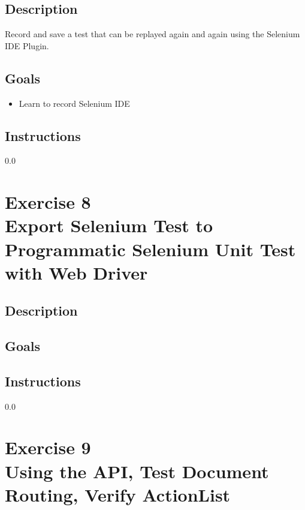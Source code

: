 \subsection*{Description}
Record and save a test that can be replayed again and again using
the Selenium IDE Plugin.

\subsection*{Goals}
\begin{itemize}
  \item Learn to record Selenium IDE 
\end{itemize}

\subsection*{Instructions}

{\setlength{\baselineskip}%
  {0.0\baselineskip}
  \section*{\flushright Exercise 8\\
  Export Selenium Test to
  Programmatic Selenium Unit Test with Web Driver}
  \hrulefill \par}

\subsection*{Description}

\subsection*{Goals}

\subsection*{Instructions}

{\setlength{\baselineskip}%
  {0.0\baselineskip}
  \section*{\flushright Exercise 9\\
  Using the API, Test Document Routing, Verify ActionList}
  \hrulefill \par}

